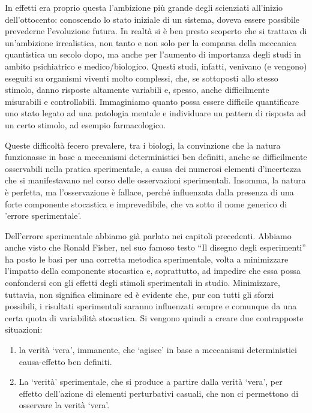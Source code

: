 \documentclass[a4paper,12pt,oneside]{book}
\providecommand{\tightlist}{%
  \setlength{\itemsep}{0pt}\setlength{\parskip}{0pt}}
\begin{document}
In effetti era proprio questa l'ambizione più grande degli scienziati all'inizio dell'ottocento: conoscendo lo stato iniziale di un sistema, doveva essere possibile prevederne l'evoluzione futura. In realtà si è ben presto scoperto che si trattava di un'ambizione irrealistica, non tanto e non solo per la comparsa della meccanica quantistica un secolo dopo, ma anche per l'aumento di importanza degli studi in ambito psichiatrico e medico/biologico. Questi studi, infatti, venivano (e vengono) eseguiti su organismi viventi molto complessi, che, se sottoposti allo stesso stimolo, danno risposte altamente variabili e, spesso, anche difficilmente misurabili e controllabili. Immaginiamo quanto possa essere difficile quantificare uno stato legato ad una patologia mentale e individuare un pattern di risposta ad un certo stimolo, ad esempio farmacologico.

Queste difficoltà fecero prevalere, tra i biologi, la convinzione che la natura funzionasse in base a meccanismi deterministici ben definiti, anche se difficilmente osservabili nella pratica sperimentale, a causa dei numerosi elementi d'incertezza che si manifestavano nel corso delle osservazioni sperimentali. Insomma, la natura è perfetta, ma l'osservazione è fallace, perché influenzata dalla presenza di una forte componente stocastica e imprevedibile, che va sotto il nome generico di 'errore sperimentale'.

Dell'errore sperimentale abbiamo già parlato nei capitoli precedenti. Abbiamo anche visto che Ronald Fisher, nel suo famoso testo ``Il disegno degli esperimenti'' ha posto le basi per una corretta metodica sperimentale, volta a minimizzare l'impatto della componente stocastica e, soprattutto, ad impedire che essa possa confondersi con gli effetti degli stimoli sperimentali in studio. Minimizzare, tuttavia, non significa eliminare ed è evidente che, pur con tutti gli sforzi possibili, i risultati sperimentali saranno influenzati sempre e comunque da una certa quota di variabilità stocastica. Si vengono quindi a creare due contrapposte situazioni:

\begin{enumerate}
\def\labelenumi{\arabic{enumi}.}
\tightlist
\item
  la verità `vera', immanente, che `agisce' in base a meccanismi deterministici causa-effetto ben definiti.
\item
  La `verità' sperimentale, che si produce a partire dalla verità `vera', per effetto dell'azione di elementi perturbativi casuali, che non ci permettono di osservare la verità `vera'.
\end{enumerate}
\end{document}
